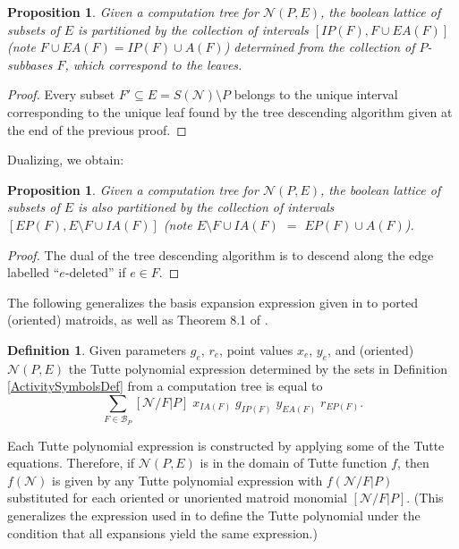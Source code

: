 \documentclass[12pt]{article}
\newtheorem{proposition}[theorem]{Proposition}
\theoremstyle{definition}
\newtheorem{definition}[theorem]{Definition}
\begin{document}

\begin{proposition}
\label{PartitionProposition}
Given a computation tree for
$\mathcal{N}(P,E)$, 
the boolean lattice of subsets of $E$
is partitioned by the collection of
intervals $[IP(F),F\cup EA(F)]$ (note $F\cup EA(F)=IP(F)\cup A(F)$)
determined from the collection
of $P$-subbases $F$, which correspond to the leaves.
\end{proposition}

\begin{proof}
Every subset $F'\subseteq E=S(\mathcal{N})\setminus P$ belongs to the
unique interval corresponding to the unique leaf found by the tree descending
algorithm given at the end of the previous proof.
\end{proof}

Dualizing, we obtain:

\begin{proposition}
\label{DualPartitionProposition}
Given a computation tree for
$\mathcal{N}(P,E)$, 
the boolean lattice of subsets of $E$
is also partitioned by the collection of
intervals $[EP(F),E\setminus F\cup IA(F)]$ 
(note $E\setminus F\cup IA(F)$ $=$ $EP(F)\cup A(F)$).
\end{proposition}
\begin{proof} The dual of the tree descending algorithm is to descend along
the edge labelled ``$e$-deleted'' if $e\in F$.
\end{proof}




The following generalizes the basis expansion expression given
in \cite{MR93a:05047} to ported (oriented) matroids, as well as 
Theorem 8.1 of \cite{SetPointedLV}.

\begin{definition}
\label{TuttePolyExpression}
Given parameters $g_e$, $r_e$, point values $x_e$, $y_e$, and 
(oriented) $\mathcal{N}(P,E)$
the Tutte polynomial expression
determined by the sets in Definition 
\ref{ActivitySymbolsDef} 
from a computation tree is 
equal to
\begin{equation}
\sum_{F\in \mathcal{B}_P}[\mathcal{N}/F|P]
\;x_{IA(F)}\;g_{IP(F)}\;y_{EA(F)}\;r_{EP(F)}.
\end{equation}
\end{definition}

Each Tutte polynomial expression is constructed by applying some of the
Tutte equations.  Therefore, if $\mathcal{N}(P,E)$ is in the domain of
Tutte function $f$, then $f(\mathcal{N})$ is given by any Tutte polynomial
expression with $f(\mathcal{N}/F|P)$ substituted for each oriented or 
unoriented matroid monomial $[\mathcal{N}/F|P]$.  (This generalizes the 
expression used in \cite{MR93a:05047} to define the Tutte polynomial under
the condition that all expansions yield the same expression.)
\end{document}
